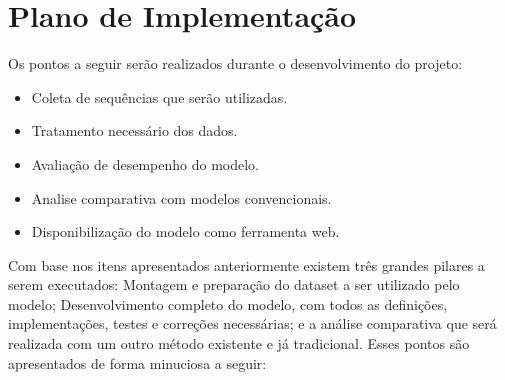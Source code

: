 \section{Plano de Implementação}

Os pontos a seguir serão realizados durante o desenvolvimento do projeto:

\begin{itemize}
  \item Coleta de sequências que serão utilizadas.
  \item Tratamento necessário dos dados.
  \item Avaliação de desempenho do modelo.
  \item Analise comparativa com modelos convencionais.
  \item Disponibilização do modelo como ferramenta web.
\end{itemize}

Com base nos itens apresentados anteriormente existem três grandes pilares a serem executados: Montagem e preparação do dataset a ser utilizado pelo modelo; Desenvolvimento completo do modelo, com todos as definições, implementações, testes e correções necessárias; e a análise comparativa que será realizada com um outro método existente e já tradicional. Esses pontos são apresentados de forma minuciosa a seguir:

